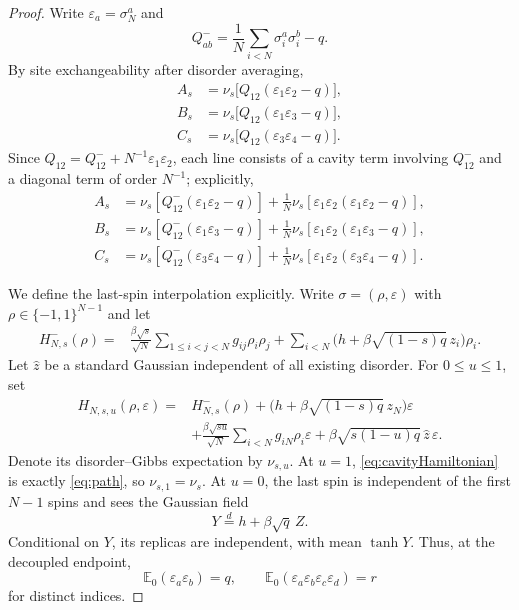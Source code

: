 \documentclass[11pt]{article}
\numberwithin{equation}{section}
\theoremstyle{plain}
\theoremstyle{definition}
\newcommand{\E}{\mathbb E}
\newcommand{\1}{\mathbf 1}
\begin{document}
\begin{proof}
Write $\varepsilon_a=\sigma_N^a$ and
\[
 Q^-_{ab}=\frac1N\sum_{i<N}\sigma_i^a\sigma_i^b-q.
\]
By site exchangeability after disorder averaging,
\begin{align}
 A_s
 &=\nu_s\bigl[Q_{12}(\varepsilon_1\varepsilon_2-q)\bigr],\nonumber\\
 B_s
 &=\nu_s\bigl[Q_{12}(\varepsilon_1\varepsilon_3-q)\bigr],\nonumber\\
 C_s
 &=\nu_s\bigl[Q_{12}(\varepsilon_3\varepsilon_4-q)\bigr].
 \label{eq:siteexchange}
\end{align}
Since
$Q_{12}=Q^-_{12}+N^{-1}\varepsilon_1\varepsilon_2$,
each line consists of a cavity term involving $Q^-_{12}$ and a
diagonal term of order $N^{-1}$; explicitly,
\begin{align}
 A_s&=\nu_s[Q^-_{12}(\varepsilon_1\varepsilon_2-q)]
 +\frac1N\nu_s[\varepsilon_1\varepsilon_2
                    (\varepsilon_1\varepsilon_2-q)],\nonumber\\
 B_s&=\nu_s[Q^-_{12}(\varepsilon_1\varepsilon_3-q)]
 +\frac1N\nu_s[\varepsilon_1\varepsilon_2
                    (\varepsilon_1\varepsilon_3-q)],\nonumber\\
 C_s&=\nu_s[Q^-_{12}(\varepsilon_3\varepsilon_4-q)]
 +\frac1N\nu_s[\varepsilon_1\varepsilon_2
                    (\varepsilon_3\varepsilon_4-q)].
 \label{eq:cavitydecomposition}
\end{align}

We define the last-spin interpolation explicitly.  Write
$\sigma=(\rho,\varepsilon)$ with
$\rho\in\{-1,1\}^{N-1}$ and let
\begin{align*}
 H^-_{N,s}(\rho)
 ={}&\frac{\beta\sqrt s}{\sqrt N}
 \sum_{1\le i<j<N}g_{ij}\rho_i\rho_j
 +\sum_{i<N}\bigl(h+\beta\sqrt{(1-s)q}\,z_i\bigr)\rho_i.
\end{align*}
Let $\widehat z$ be a standard Gaussian independent of all existing
disorder.  For $0\le u\le1$, set
\begin{align}
 H_{N,s,u}(\rho,\varepsilon)
 ={}&H^-_{N,s}(\rho)
 +\bigl(h+\beta\sqrt{(1-s)q}\,z_N\bigr)\varepsilon\nonumber\\
 &+\frac{\beta\sqrt{su}}{\sqrt N}
   \sum_{i<N}g_{iN}\rho_i\varepsilon
 +\beta\sqrt{s(1-u)q}\,\widehat z\,\varepsilon .
 \label{eq:cavityHamiltonian}
\end{align}
Denote its disorder--Gibbs expectation by $\nu_{s,u}$.  At $u=1$,
\eqref{eq:cavityHamiltonian} is exactly \eqref{eq:path}, so
$\nu_{s,1}=\nu_s$.  At $u=0$, the last spin is independent of the
first $N-1$ spins and sees the Gaussian field
\[
 Y\stackrel d=h+\beta\sqrt q\,Z.
\]
Conditional on $Y$, its replicas are independent, with mean
$\tanh Y$.  Thus, at the decoupled endpoint,
\begin{equation}
 \E_0(\varepsilon_a\varepsilon_b)=q,\qquad
 \E_0(\varepsilon_a\varepsilon_b\varepsilon_c\varepsilon_d)=r
 \label{eq:epsilonmoments}
\end{equation}
for distinct indices.


\end{proof}
\end{document}
